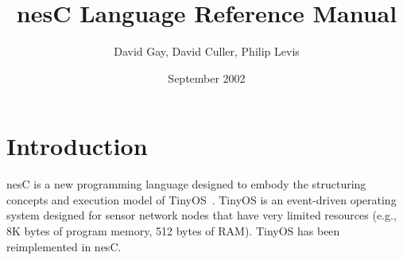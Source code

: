 \documentclass[11pt]{article}
\newcommand{\nesc}{nesC\xspace}
\begin{document}
\title{\nesc Language Reference Manual}
\author{David Gay, David Culler, Philip Levis}
\date{September 2002}

\maketitle

\section{Introduction}

\nesc is a new programming language designed to embody the structuring
concepts and execution model of TinyOS~\cite{tinyos}. TinyOS is an
event-driven operating system designed for sensor network nodes that
have very limited resources (e.g., 8K bytes of program memory, 512 bytes of
RAM). TinyOS has been reimplemented in \nesc.
\end{document}
